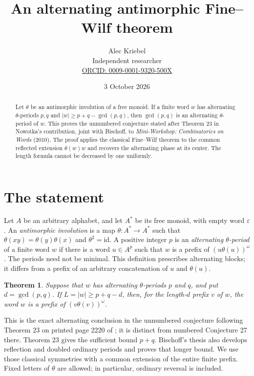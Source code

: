 \documentclass[10pt]{article}
\title{An alternating antimorphic Fine--Wilf theorem}
\author{Alec Kriebel\\\small Independent researcher\\
  \small\href{https://orcid.org/0009-0001-9320-500X}{ORCID: 0009-0001-9320-500X}}
\date{3 October 2026}
\newtheorem{theorem}{Theorem}
\begin{document}
\maketitle
\begin{abstract}
Let $\theta$ be an antimorphic involution of a free monoid. If a finite
word $w$ has alternating $\theta$-periods $p,q$ and
$|w|\ge p+q-\gcd(p,q)$, then $\gcd(p,q)$ is an alternating
$\theta$-period of $w$. This proves the unnumbered conjecture stated
after Theorem 23 in Nowotka's contribution, joint with Bischoff, to
\emph{Mini-Workshop: Combinatorics on Words} (2010). The proof applies
the classical Fine--Wilf theorem to the common reflected extension
$\theta(w)w$ and recovers the alternating phase at its center.
The length formula cannot be decreased by one uniformly.
\end{abstract}

\section{The statement}
Let $A$ be an arbitrary alphabet, and let $A^*$ be its free monoid,
with empty word $\varepsilon$. An \emph{antimorphic involution} is a map
$\theta:A^*\to A^*$ such that $\theta(xy)=\theta(y)\theta(x)$ and
$\theta^2=\mathrm{id}$. A positive integer $p$ is an
\emph{alternating $\theta$-period} of a finite word $w$ if there is a
word $u\in A^p$ such that $w$ is a prefix of $(u\theta(u))^\omega$.
The periods need not be minimal. This definition prescribes alternating
blocks; it differs from a prefix of an arbitrary concatenation of $u$
and $\theta(u)$.

\begin{theorem}\label{thm:main}
Suppose that $w$ has alternating $\theta$-periods $p$ and $q$, and put
$d=\gcd(p,q)$. If $L=|w|\ge p+q-d$, then, for the length-$d$ prefix
$v$ of $w$, the word $w$ is a prefix of $(v\theta(v))^\omega$.
\end{theorem}

This is the exact alternating conclusion in the unnumbered conjecture
following Theorem 23 on printed page 2220 of \cite{OWR}; it is distinct
from numbered Conjecture 27 there. Theorem 23 gives the sufficient
bound $p+q$. Bischoff's thesis \cite[Lemma 3.9 and Satz 3.11]{Bischoff}
also develops reflection and doubled ordinary periods and proves that
longer bound. We use those classical symmetries with a common extension
of the entire finite prefix. Fixed letters of $\theta$ are allowed;
in particular, ordinary reversal is included.
\end{document}

